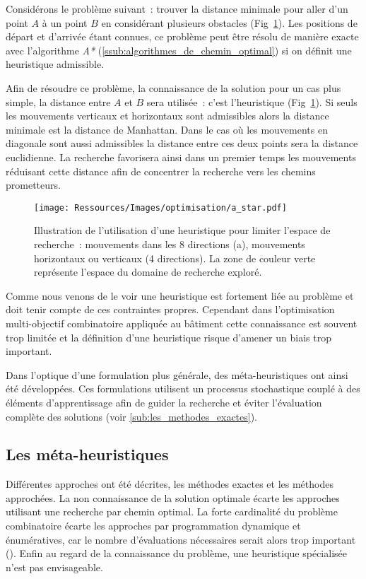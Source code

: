 Considérons le problème suivant~: trouver la distance minimale pour aller d’un point
$A$ à un point $B$ en considérant plusieurs obstacles (Fig~\ref{fig:a_star}).
Les positions de départ et d’arrivée étant connues, ce problème peut être résolu
de manière exacte avec l’algorithme \textit{A*} (\ref{ssub:algorithmes_de_chemin_optimal})
si on définit une heuristique admissible.

Afin de résoudre ce problème, la connaissance de la solution pour un cas plus
simple, la distance entre $A$ et $B$ sera utilisée~: c’est l’heuristique
(Fig~\ref{fig:a_star}). Si seuls les mouvements verticaux et horizontaux sont
admissibles alors la distance minimale est la distance de Manhattan. Dans le cas
où les mouvements en diagonale sont aussi admissibles la distance entre ces deux
points sera la distance euclidienne. La recherche favorisera ainsi dans un
premier temps les mouvements réduisant cette distance afin de concentrer la
recherche vers les chemins prometteurs.

\begin{figure}
    \begin{center}
        \texttt{[image: Ressources/Images/optimisation/a\_star.pdf]}
    \end{center}
    \caption{Illustration de l’utilisation d’une heuristique pour limiter l’espace
             de recherche~: mouvements dans les 8 directions (a), mouvements
             horizontaux ou verticaux (4 directions). La zone de couleur verte
             représente l’espace du domaine de recherche exploré.
             \label{fig:a_star}}
\end{figure}

Comme nous venons de le voir une heuristique est fortement liée au problème et
doit tenir compte de ces contraintes propres. Cependant dans l’optimisation
multi-objectif combinatoire appliquée au bâtiment cette connaissance est souvent
trop limitée et la définition d’une heuristique risque d’amener un biais trop
important.

Dans l’optique d’une formulation plus générale, des méta-heuristiques ont ainsi
été développées. Ces formulations utilisent un processus stochastique couplé à des
éléments d’apprentissage afin de guider la recherche et éviter l’évaluation
complète des solutions (voir \ref{sub:les_methodes_exactes}).



\subsection{Les méta-heuristiques} %
\label{sub:les_méta_heuristiques}
Différentes approches ont été décrites, les méthodes exactes et les méthodes approchées.
La non connaissance de la solution optimale écarte les approches utilisant une recherche
par chemin optimal. La forte cardinalité du problème combinatoire écarte les approches par
programmation dynamique et énumératives, car le nombre d’évaluations nécessaires serait
alors trop important (). Enfin au regard de la
connaissance du problème, une heuristique spécialisée n’est pas envisageable.

